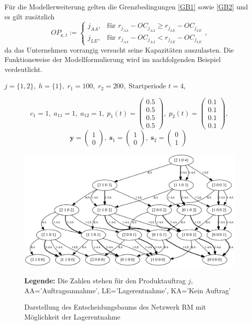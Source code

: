 Für die Modellerweiterung gelten die Grenzbedingungen \eqref{GB1} sowie \eqref{GB2} und es gilt zusätzlich
\begin{equation}\label{GB3}
     OP_{\textbf{c}, t}:=\left\{\begin{array}{ll} j_{AA}, & \text{für } r_{j_{AA}} - OC_{j_{AA}} \ge r_{j_{LE}} - OC_{j_{LE}}\\
         j_{LE}, & \text{für } r_{j_{AA}} - OC_{j_{AA}} < r_{j_{LE}} - OC_{j_{LE}}\end{array}\right. ,
\end{equation}
da das Unternehmen vorrangig versucht seine Kapazitäten auszulasten. Die Funktionsweise der Modellformulierung wird im nachfolgenden Beispiel verdeutlicht.
\begin{center}
$j = \{1, 2\}, \; h = \{1\}, \; r_{1} = 100, \; r_{2} = 200, \; \text{Startperiode } t=4$,
\end{center}
\[
    c_{1}=1, \;
    a_{11}=1, \;
     a_{12}=1, \;
     p_{1}(t)=\begin{pmatrix} 0.5\\ 0.5\\ 0.5\\ 0.5  \end{pmatrix}, \;
     p_{2}(t)=\begin{pmatrix} 0.1\\ 0.1\\ 0.1\\ 0.1  \end{pmatrix},
  \]
  \[
    \textbf{y}=\begin{pmatrix} 1 \\ 0 \end{pmatrix}, \;
    \textbf{s}_1=\begin{pmatrix} 1 \\ 0 \end{pmatrix}, \;
     \textbf{s}_2=\begin{pmatrix} 0 \\ 1 \end{pmatrix} \;
  \]

\begin{figure}[h!]
  \begin{center}
    \includegraphics[width=130mm]{Bilder/Beispiel3.pdf}
    \caption{Darstellung des Entscheidungsbaums des Netzwerk RM mit Möglichkeit der Lagerentnahme}  \label{B3}
    {\footnotesize \textbf{Legende:} Die Zahlen stehen für den Produktauftrag $j$, AA='Auftragsannahme', LE='Lagerentnahme', KA='Kein Auftrag'} 
  \end{center}
\end{figure}

